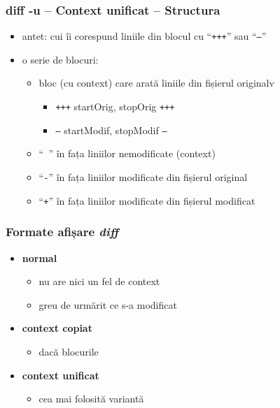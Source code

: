 \documentclass{beamer}
\begin{document}
\begin{frame}
  \frametitle{\textbf{diff -u} – Context unificat – Structura}
  \begin{itemize}
  \item antet: cui îi corespund liniile din blocul cu ``\texttt{\texttt{+++}}'' sau ``\texttt{---}''
    \item o serie de blocuri:
      \begin{itemize}
      \item bloc (cu context) care arată liniile din fișierul originalv
        \begin{itemize} 
        \item \texttt{+++} startOrig, stopOrig \texttt{+++}
        \item \texttt{---} startModif, stopModif \texttt{---}
        \end{itemize}
      \item ``\texttt{ }'' în fața liniilor nemodificate (context)
      \item ``\texttt{-}'' în fața liniilor modificate din fișierul original
      \item ``\texttt{+}'' în fața liniilor modificate din fișierul modificat
      \end{itemize}
  \end{itemize}
\end{frame}

\begin{frame}
  \frametitle{\textbf Formate afișare \textit{diff}}
  \begin{itemize}[<+->]
    \item \textbf{normal}
      \begin{itemize}[<+->]
        \item nu are nici un fel de context
        \item greu de urmărit ce s-a modificat
      \end{itemize}

    \item \textbf{context copiat}
      \begin{itemize}
        \item dacă blocurile
      \end{itemize}
      
    \item \textbf{context unificat}
      \begin{itemize}
        \item cea mai folosită variantă
      \end{itemize}
  \end{itemize}
\end{frame}
    
\end{document}

